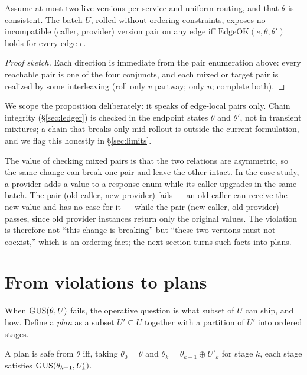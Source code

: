\begin{proposition}
\label{prop:adequacy}
Assume at most two live versions per service and uniform routing, and
that $\theta$ is consistent. The batch $U$, rolled without ordering
constraints, exposes no incompatible (caller, provider) version pair
on any edge iff $\mathrm{EdgeOK}(e,\theta,\theta')$ holds for every
edge $e$.
\end{proposition}
\begin{proof}[Proof sketch]
Each direction is immediate from the pair enumeration above: every
reachable pair is one of the four conjuncts, and each mixed or target
pair is realized by some interleaving (roll only $v$ partway; only
$u$; complete both).
\end{proof}

We scope the proposition deliberately: it speaks of edge-local pairs
only. Chain integrity (\S\ref{sec:ledger}) is checked in the endpoint
states $\theta$ and $\theta'$, not in transient mixtures; a chain that
breaks only mid-rollout is outside the current formulation, and we
flag this honestly in \S\ref{sec:limits}.

The value of checking mixed pairs is that the two relations are
asymmetric, so the same change can break one pair and leave the other
intact. In the case study, a provider adds a value to a response enum
while its caller upgrades in the same batch. The pair (old caller, new
provider) fails --- an old caller can receive the new value and has no
case for it --- while the pair (new caller, old provider) passes,
since old provider instances return only the original values. The violation is therefore not ``this change is
breaking'' but ``these two versions must not coexist,'' which is an
ordering fact; the next section turns such facts into plans.

\section{From violations to plans}
\label{sec:mss}

When $\mathrm{GUS}(\theta,U)$ fails, the operative question is what subset of
$U$ can ship, and how. Define a \emph{plan} as a subset
$U' \subseteq U$ together with a partition of $U'$ into ordered stages.

\begin{definition}
\label{def:plan}
A plan is safe from $\theta$ iff, taking $\theta_0 = \theta$ and
$\theta_k = \theta_{k-1} \oplus U'_k$ for stage $k$, each stage
satisfies $\mathrm{GUS}(\theta_{k-1}, U'_k)$.
\end{definition}

